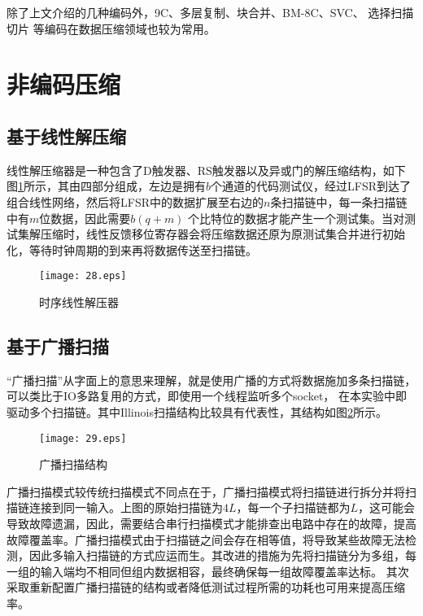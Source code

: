 除了上文介绍的几种编码外，9C\cite{64}、多层复制\cite{65}、块合并\cite{66}、BM-8C\cite{67}、SVC\cite{68}、 选择扫描切片\cite{69} 等编码在数据压缩领域也较为常用。

\section{非编码压缩}

\subsection{基于线性解压缩}

线性解压缩器是一种包含了D触发器、RS触发器以及异或门的解压缩结构，如下图\ref{28}所示，其由四部分组成，左边是拥有$b$个通道的代码测试仪，经过LFSR到达了组合线性网络，然后将LFSR中的数据扩展至右边的$n$条扫描链中，每一条扫描链中有$m$位数据，因此需要$b(q+m)$ 个比特位的数据才能产生一个测试集。当对测试集解压缩时，线性反馈移位寄存器会将压缩数据还原为原测试集合并进行初始化，等待时钟周期的到来再将数据传送至扫描链。

\begin{figure}[H]
  \vspace{\baselineskip}
  \centering
  \texttt{[image: 28.eps]}
  \vspace{\baselineskip}
  \caption{时序线性解压器}\label{28}
     \end{figure}

\subsection{基于广播扫描}

“广播扫描”从字面上的意思来理解，就是使用广播的方式将数据施加多条扫描链，可以类比于IO多路复用的方式，即使用一个线程监听多个socket， 在本实验中即驱动多个扫描链。其中Illinois扫描结构\cite{70}比较具有代表性，其结构如图\ref{29}所示。

\begin{figure}[H]
  \centering
  \texttt{[image: 29.eps]}
  \caption{广播扫描结构}\label{29}
     \end{figure}

广播扫描模式较传统扫描模式不同点在于，广播扫描模式将扫描链进行拆分并将扫描链连接到同一输入。上图的原始扫描链为$4L$，每一个子扫描链都为$L$，这可能会导致故障遗漏，因此，需要结合串行扫描模式才能排查出电路中存在的故障，提高故障覆盖率。广播扫描模式由于扫描链之间会存在相等值，将导致某些故障无法检测，因此多输入扫描链的方式应运而生。其改进的措施为先将扫描链分为多组，每一组的输入端均不相同但组内数据相容，最终确保每一组故障覆盖率达标。 其次采取重新配置广播扫描链的结构或者降低测试过程所需的功耗也可用来提高压缩率。

